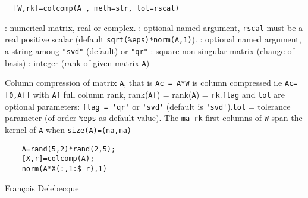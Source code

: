 \begin{calling_sequence}
\begin{verbatim}
  [W,rk]=colcomp(A , meth=str, tol=rscal) 
\end{verbatim}
\end{calling_sequence}
\begin{parameters}
  \begin{varlist}
    : numerical matrix, real or complex.
    : optional named argument, \verb+rscal+ must be  a real positive scalar (default \verb+sqrt(%eps)*norm(A,1)+).
    : optional named argument, a string among \verb+"svd"+ (default) or \verb+"qr"+
    :  square non-singular matrix (change of basis)
    : integer (rank of given matrix \verb!A!)
  \end{varlist}
\end{parameters}
\begin{mandescription}
  Column compression of matrix \verb!A!, that is \verb!Ac = A*W! is 
  column compressed i.e \verb!Ac=[0,Af]! with \verb!Af! full column rank, 
  rank(\verb!Af!) = rank(\verb!A!) = \verb!rk!.\verb!flag! and \verb!tol! are optional parameters: \verb!flag = 'qr'! 
  or \verb!'svd'! (default is \verb!'svd'!).\verb!tol! = tolerance parameter (of order \verb!%eps! as default value).
  The \verb!ma-rk! first columns of \verb!W! span the kernel of \verb!A! 
  when \verb!size(A)=(na,ma)!
\end{mandescription}
\begin{examples}
  \begin{Verbatim}
    A=rand(5,2)*rand(2,5);
    [X,r]=colcomp(A);
    norm(A*X(:,1:$-r),1)
  \end{Verbatim}
\end{examples}
\begin{manseealso}
       
\end{manseealso}
\begin{authors}
  Fran\c{c}ois Delebecque
\end{authors}
